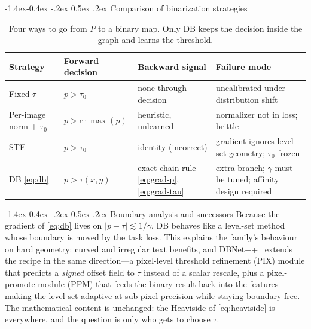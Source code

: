 \documentclass[11pt,a4paper]{article}
\makeatletter
\renewcommand\subsection{\@startsection{subsection}{2}{\z@}%
                                     {-1.4ex\@plus -0.4ex \@minus -.2ex}%
                                     {0.5ex \@plus .2ex}%
                                     {\normalfont\normalsize\bfseries}}
\newcommand{\rc}[1]{{\raggedright #1\par}}
\newcommand{\1}{\mathbf{1}}
\makeatother
\begin{document}
\subsection{Comparison of binarization strategies}
\begin{table}[H]
\centering
\footnotesize
\caption{Four ways to go from $P$ to a binary map. Only DB keeps the decision inside the graph and learns the threshold.}
\label{tab:compare}
\begin{tabular}{@{}p{2.9cm} p{3.6cm} p{3.6cm} p{4.6cm}@{}}
\toprule
\textbf{Strategy} & \rc{\textbf{Forward decision}} & \rc{\textbf{Backward signal}} & \rc{\textbf{Failure mode}} \\
\midrule
Fixed $\tau$ & $p > \tau_0$ & none through decision & uncalibrated under distribution shift \\
Per-image norm + $\tau_0$ & $p > c\cdot\max(p)$ & heuristic, unlearned & normalizer not in loss; brittle \\
STE & $p > \tau_0$ & identity (incorrect) & gradient ignores level-set geometry; $\tau_0$ frozen \\
DB \eqref{eq:db} & $p > \tau(x,y)$ & exact chain rule \eqref{eq:grad-p}, \eqref{eq:grad-tau} & extra branch; $\gamma$ must be tuned; affinity design required \\
\bottomrule
\end{tabular}
\end{table}

\subsection{Boundary analysis and successors}
Because the gradient of \eqref{eq:db} lives on $|p - \tau| \lesssim 1/\gamma$, DB behaves like a level-set method whose boundary is moved by the task loss. This explains the family's behaviour on hard geometry: curved and irregular text benefits, and DBNet++~\cite{dbnetpp} extends the recipe in the same direction---a pixel-level threshold refinement (PIX) module that predicts a \emph{signed} offset field to $\tau$ instead of a scalar rescale, plus a pixel-promote module (PPM) that feeds the binary result back into the features---making the level set adaptive at sub-pixel precision while staying boundary-free. The mathematical content is unchanged: the Heaviside of \eqref{eq:heaviside} is everywhere, and the question is only who gets to choose $\tau$.
\end{document}
